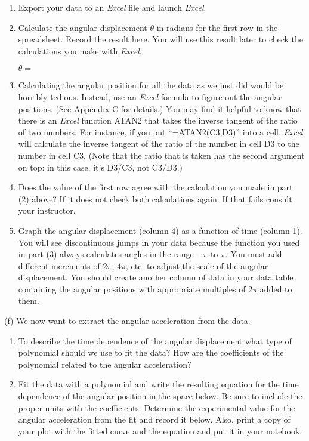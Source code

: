 \begin{enumerate}
\item Export your data to an \textit{Excel} file and launch 
\textit{Excel}.

\item Calculate the angular displacement \( \theta  \) in radians for the first row
in the spreadsheet. Record the result here.
You will use this result later to check the calculations you make with 
\textit{Excel}.


$\theta =$

\item Calculating the angular position for all the data as we just did
would be horribly tedious. Instead, use an {\it Excel} formula to
figure out the angular positions.  (See Appendix C for details.)
You may find it helpful to know that there is an {\it Excel} function
ATAN2 that takes the inverse tangent of the ratio of two numbers.
For instance, if you put ``=ATAN2(C3,D3)'' into a cell, {\it Excel}
will calculate the inverse tangent of the ratio of the number
in cell D3 to the number in cell C3.  (Note that the ratio
that is taken has the second argument on top: in this case, it's 
D3/C3, not C3/D3.)

\item Does the value of the first row agree with the calculation you made in part
(2) above? If it does not check both calculations again. If that fails consult
your instructor. 
\item Graph the angular displacement (column 4) as a function of time (column 1).
You will see discontinuous jumps in your data because the function you used
in part (3) always calculates angles in the range \( -\pi  \) to \( \pi  \).
You must add different increments of \( 2\pi  \), \(4 \pi  \), etc. to adjust
the scale of the angular displacement.  You should create another
column of data in your data table containing the angular positions with
appropriate multiples of $2\pi$ added to them.
\end{enumerate}
(f) We now want to extract the angular acceleration from the data.

\begin{enumerate}
\item To describe the time dependence of the angular displacement what type of polynomial
should we use to fit the data? How are the coefficients of the polynomial related
to the angular acceleration?\vspace{20mm}

\item Fit the data with a polynomial and write the resulting equation for the time
dependence of the angular position in the space below. Be sure to include the
proper units with the coefficients. Determine the experimental value for the
angular acceleration from the fit and record it below. Also, print a copy of
your plot with the fitted curve and the equation and put it in your notebook.\vspace{20mm}

\end{enumerate}


